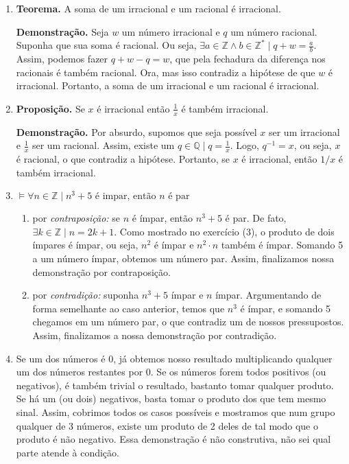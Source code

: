 \documentclass{article}
\begin{document}
\begin{enumerate}
    \item \textbf{Teorema.} A soma de um irracional e um racional é irracional.

        \textbf{Demonstração.} Seja \( w \) um número irracional e \( q \) um número racional. Suponha que sua soma é racional. Ou seja, \( \exists a \in \mathbb{Z} \land b \in \mathbb{Z}^* \mid q + w = \frac{a}{b} \). Assim, podemos fazer \( q + w - q = w \), que pela fechadura da diferença nos racionais é também racional. Ora, mas isso contradiz a hipótese de que \( w \) é irracional. Portanto, a soma de um irracional e um racional é irracional.

    \item \textbf{Proposição.} Se \( x \) é irracional então \( \frac{1}{x} \) é também irracional.

        \textbf{Demonstração.} Por absurdo, supomos que seja possível \( x \) ser um irracional e \( \frac{1}{x} \) ser um racional. Assim, existe um \( q \in \mathbb{Q} \mid q = \frac{1}{x}\). Logo, \( q^{-1} = x \), ou seja, \( x \) é racional, o que contradiz a hipótese. Portanto, se \( x \) é irracional, então \( 1/x \) é também irracional.

    \item \( \models \forall n \in \mathbb{Z} \mid n^3 + 5 \textrm{ é impar, então } n \textrm{ é par}  \)

        \begin{enumerate}

            \item por \textit{contraposição:} se \( n \) é ímpar, então \( n^3 + 5 \) é par. De fato, \( \exists k \in \mathbb{Z} \mid n = 2k + 1\). Como mostrado no exercício (3), o produto de dois ímpares é ímpar, ou seja, \( n^2 \) é ímpar e \( n^2 \cdot n \) também é ímpar. Somando 5 a um número ímpar, obtemos um número par. Assim, finalizamos nossa demonstração por contraposição.

            \item por \textit{contradição:} suponha \( n^3 + 5 \) ímpar e \( n \) ímpar. Argumentando de forma semelhante ao caso anterior, temos que \( n^3 \) é ímpar, e somando 5 chegamos em um número par, o que contradiz um de nossos pressupostos. Assim, finalizamos a nossa demonstração por contradição.

        \end{enumerate}

    \item Se um dos números é 0, já obtemos nosso resultado multiplicando qualquer um dos números restantes por 0. Se os números forem todos positivos (ou negativos), é também trivial o resultado, bastanto tomar qualquer produto. Se há um (ou dois) negativos, basta tomar o produto dos que tem mesmo sinal. Assim, cobrimos todos os casos possíveis e mostramos que num grupo qualquer de 3 números, existe um produto de 2 deles de tal modo que o produto é não negativo. Essa demonstração é não construtiva, não sei qual parte atende à condição.


\end{enumerate}
\end{document}
